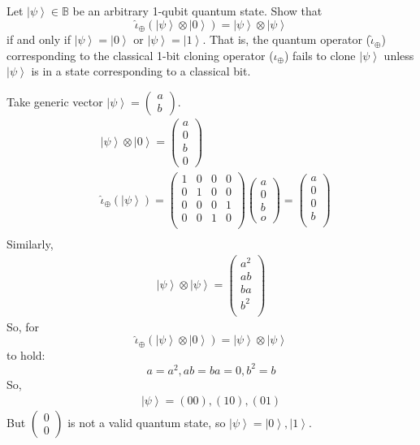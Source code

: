 \documentclass{exam} %
\newcommand{\m}[1]{\mathbb{#1}}    %
\theoremstyle{plain}
\theoremstyle{definition}
\theoremstyle{remark}
\newcommand{\pmat}[1]{ \begin{pmatrix} #1 \end{pmatrix} }
\numberwithin{equation}{section}  %
\newcommand{\ket}[1]{ \left| #1 \right> }
\begin{document}
\begin{questions}
Let $\ket{\psi}\in \m{B}$ be an arbitrary 1-qubit quantum state. Show that
\[
  \widehat{\iota}_{\oplus}(\ket{\psi}\otimes \ket{0})
  = \ket{\psi}\otimes \ket{\psi}
\]
if and only if $\ket{\psi} = \ket{0}$ or $\ket{\psi} = \ket{1}$. That is,
the quantum operator ($\widehat{\iota}_{\oplus}$) corresponding to the
classical 1-bit cloning operator ($\iota_{\oplus}$) fails to clone
$\ket{\psi}$ unless $\ket{\psi}$ is in a state corresponding to a classical
bit.
\begin{solution}
  Take generic vector $\ket{\psi} = \pmat{a\\b}$.
  \begin{align*}
    &\ket{\psi} \otimes \ket{0} = \pmat{a\\0\\b\\0}\\
    &\widehat{\iota}_{\oplus} (\ket{\psi}) = 
    \pmat{
      1 & 0 & 0 & 0 \\
      0 & 1 & 0 & 0 \\
      0 & 0 & 0 & 1 \\
      0 & 0 & 1 & 0 \\
    }
    \pmat{
      a \\
      0 \\
      b \\
      o
    } = 
    \pmat{
      a \\
      0 \\
      0 \\
      b \\
    }\\
  \end{align*}
  Similarly,
  \begin{align*}
    \ket{\psi} \otimes \ket{\psi} = 
    \pmat{
      a^2\\
      ab\\
      ba\\
      b^2\\
    }
  \end{align*}
  So, for 
  \[
    \widehat{\iota}_{\oplus}(\ket{\psi}\otimes \ket{0})
    = \ket{\psi}\otimes \ket{\psi}
  \]
  to hold:
  \[
    a = a^2, ab = ba = 0, b^2 = b
  \]
  So,
  \begin{align*}
    \ket{\psi} = (0 0), (1 0), (0 1)
  \end{align*}
  But $\pmat{0\\0}$ is not a valid quantum state, so $\ket{\psi} = 
  \ket{0}, \ket{1}$.
\end{solution}

\end{questions}
\end{document}
